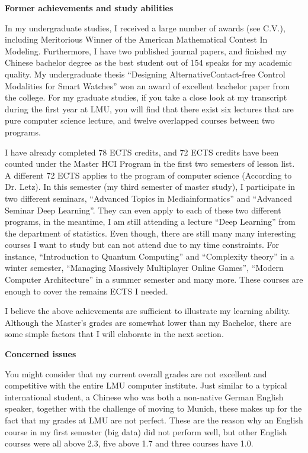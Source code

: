 \documentclass[11pt,a4paper,sans]{moderncv}        %
\begin{document}
\textbf{Former achievements and study abilities}

In my undergraduate studies, I received a large number of awards (see C.V.), including 
Meritorious Winner of the American Mathematical Contest In Modeling. Furthermore, I have 
two published journal papers, and finished my Chinese bachelor degree as the best student 
out of 154 speaks for my academic quality. My undergraduate thesis 
``Designing AlternativeContact-free Control Modalities for Smart Watches'' won an award of 
excellent bachelor paper from the college.
For my graduate studies, if you take a close look at my transcript during the first year 
at LMU, you will find that there exist six lectures that are pure computer science lecture, 
and twelve overlapped courses between two programs.

I have already completed 78 ECTS credits, and 72 ECTS credits have been counted under the 
Master HCI Program in the first two semesters of lesson list. A different 72 ECTS applies 
to the program of computer science (According to Dr. Letz). 
In this semester (my third semester of master study), I participate in two different 
seminars, ``Advanced Topics in Mediainformatics'' and ``Advanced Seminar Deep Learning''. 
They can even apply to each of these two different programs, in the meantime, I am still 
attending a lecture ``Deep Learning'' from the department of statistics. Even though, 
there are still many many interesting courses I want to study but can not attend due to my 
time constraints. For instance, ``Introduction to Quantum Computing'' and 
``Complexity theory'' in a winter semester, ``Managing Massively Multiplayer Online Games'', 
``Modern Computer Architecture'' in a summer semester and many more. These courses are 
enough to cover the remains ECTS I needed.

I believe the above achievements are sufficient to illustrate my learning ability. 
Although the Master's grades are somewhat lower than my Bachelor, there are some simple 
factors that I will elaborate in the next section.

\textbf{Concerned issues}

You might consider that my current overall grades are not excellent and competitive with 
the entire LMU computer institute. Just similar to a typical international student, a 
Chinese who was both a non-native German English speaker, together with the challenge of 
moving to Munich, these makes up for the fact that my grades at LMU are not perfect. These 
are the reason why an English course in my first semester (big data) did not perform well, 
but other English courses were all above 2.3, five above 1.7 and three courses have 1.0.
\end{document}
